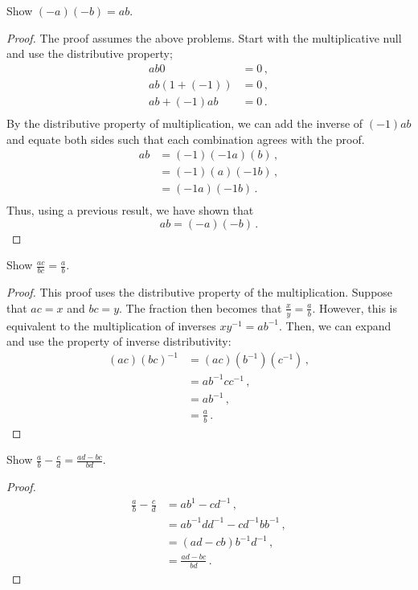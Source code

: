 \fullpageboxline
\begin{problem}
    Show $(-a)(-b) = ab$.
\end{problem}
\begin{proof}
    The proof assumes the above problems. Start with the multiplicative null and use the distributive property;
    \begin{align*}
        ab0 &= 0\,,\\
        ab(1 + (-1)) &= 0\,, \\
        ab + (-1)ab &= 0\,. \\
    \end{align*}
    By the distributive property of multiplication, we can add the inverse of $(-1)ab$ and equate both sides such that each combination agrees with the proof.
    \begin{align*}
        ab &= (-1)(-1a)(b)\,,\\
           &= (-1)(a)(-1b)\,,\\
           &= (-1a)(-1b)\,.\\
    \end{align*}
    Thus, using a previous result, we have shown that
    \begin{equation*}
        ab = (-a)(-b)\,.
    \end{equation*}
\end{proof}

\fullpageboxline
\begin{problem}
    Show $\frac{ac}{bc} = \frac{a}{b}$.
\end{problem}
\begin{proof}
    This proof uses the distributive property of the multiplication. Suppose that $ac = x$ and $bc = y$. The fraction then becomes that $\frac{x}{y} = \frac{a}{b}$. However, this is equivalent to the multiplication of inverses $xy^{-1} = a b^{-1}$. Then, we can expand and use the property of inverse distributivity:
    \begin{align*}
        (ac)(bc)^{-1} &= (ac)(b^{-1})(c^{-1})\,, \\
        &= ab^{-1}cc^{-1}\,, \\
        &= a b^{-1}\,,\\
        &= \frac{a}{b}\,.
    \end{align*}
\end{proof}

\fullpageboxline
\begin{problem}
    Show $\frac{a}{b} - \frac{c}{d} = \frac{ad - bc}{bd}$.
\end{problem}
\begin{proof}
    \begin{align*}
        \frac{a}{b} - \frac{c}{d} &= a b^{1} - c d^{-1}\,, \\
        &= a b^{-1} d d^{-1} -  c d^{-1} b b^{-1}\,, \\
        &= (a  d - c b)b^{-1}d^{-1}\,, \\
        &= \frac{ad-bc}{bd}\,.
    \end{align*}
\end{proof}


